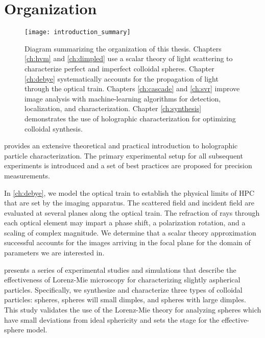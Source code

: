 \section{Organization}

\begin{figure}
  \centering
  \texttt{[image: introduction\_summary]}
  \caption{Diagram summarizing the organization of this thesis.
    Chapters \ref{ch:hvm} and \ref{ch:dimpled} use a scalar
    theory of light scattering to characterize perfect and imperfect
    colloidal spheres. Chapter \ref{ch:debye} systematically
    accounts for the propagation of light through the optical
    train. Chapters \ref{ch:cascade} and \ref{ch:svr} improve
    image analysis with machine-learning algorithms for detection, localization,
    and characterization. Chapter \ref{ch:synthesis} demonstrates the use
    of holographic characterization for optimizing colloidal
    synthesis.}
  \label{fig:intro}
\end{figure}

 provides an extensive theoretical and practical
introduction to holographic particle characterization. The primary
experimental setup for all subsequent experiments is introduced and
a set of best practices are proposed for precision measurements. 

In \autoref{ch:debye}, we model the optical train to establish the
physical limits of HPC that are set by the imaging apparatus. The scattered
field and incident field are evaluated at several planes along the
optical train. The refraction of rays through each optical element
may impart a phase shift, a polarization rotation, and a scaling
of complex magnitude. We determine that a scalar theory
approximation successful accounts for the images arriving in the
focal plane for the domain of parameters we are interested in.

 presents a series of experimental studies and
simulations that describe the effectiveness of Lorenz-Mie
microscopy for characterizing slightly aspherical particles.
Specifically, we synthesize and characterize three types of colloidal
particles: spheres, spheres will small dimples, and spheres with large dimples.
This study validates the use of the Lorenz-Mie theory
for analyzing spheres which have small deviations from
ideal sphericity and sets the stage for the effective-sphere model.

